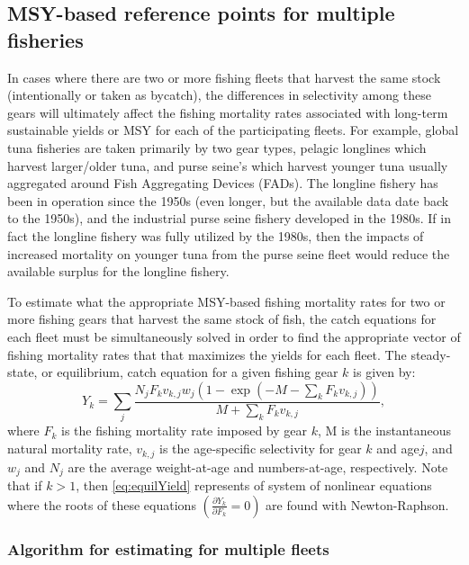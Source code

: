 
\subsection{MSY-based reference points for multiple fisheries} %
\label{sub:msy_based_reference_points_for_multiple_fisheries}

In cases where there are two or more fishing fleets that harvest the same stock (intentionally or taken as bycatch), the differences in selectivity among these gears will ultimately affect the fishing mortality rates associated with long-term sustainable yields or MSY for each of the participating fleets.  For example, global tuna fisheries are taken primarily by two gear types, pelagic longlines which harvest larger/older tuna, and purse seine's which harvest younger tuna usually aggregated around Fish Aggregating Devices (FADs).  The longline fishery has been in operation since the 1950s (even longer, but the available data date back to the 1950s), and the industrial purse seine fishery developed in the 1980s.  If in fact the longline fishery was fully utilized by the 1980s, then the impacts of increased mortality on younger tuna from the purse seine fleet would reduce the available surplus for the longline fishery.

To estimate what the appropriate MSY-based fishing mortality rates for two or more fishing gears that harvest the same stock of fish, the catch equations for each fleet must be simultaneously solved in order to find the appropriate vector of fishing mortality rates that that maximizes the yields for each fleet.  The steady-state, or equilibrium, catch equation for a given fishing gear $k$ is given by:
\begin{equation}\label{eq:equilYield}
	 Y_{k} = \sum_j\frac{N_j F_k v_{k,j} w_j (1-\exp(-M-\sum_k F_k v_{k,j}))} {M + \sum_k F_k v_{k,j}},
\end{equation}
where $F_k$ is the fishing mortality rate imposed by gear $k$, M is the instantaneous natural mortality rate, $v_{k,j}$ is the age-specific selectivity for gear $k$ and age$j$, and $w_j$ and $N_j$ are the average weight-at-age and numbers-at-age, respectively.  Note that if $k>1$, then \eqref{eq:equilYield} represents of system of nonlinear equations where the roots of these equations $\left(\frac{\partial Y_k}{\partial F_k}=0\right)$ are found with Newton-Raphson.

\subsubsection{Algorithm for estimating \fmsy for multiple fleets} %
\label{ssub:algorithm_for_estimating_fmsy_for_multiple_fleets}




